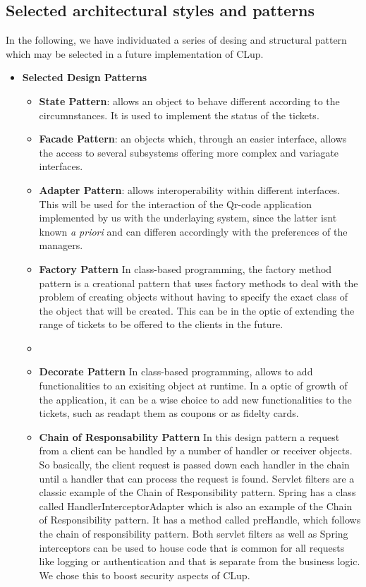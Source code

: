 \subsection{Selected architectural styles and patterns}
\label{subsect:selectedarchitecturalstylesandpatterns}

In the following, we have individuated a series of desing and structural pattern which may be selected in a future implementation of CLup.


\begin{itemize}
    \item \textbf{Selected Design Patterns}
          \begin{itemize}
            
            \item \textbf{State Pattern}: allows an object to behave different according to the circumnstances. It is used to implement the status of the tickets.
            \item \textbf{Facade Pattern}: an objects which, through an easier interface, allows the access to several subsystems offering more complex and variagate interfaces.
            \item \textbf{Adapter Pattern}: allows interoperability within different interfaces. This will be used for the interaction of the Qr-code application implemented by us with the underlaying system, since the latter isnt known \textit{a priori} and can differen accordingly with the preferences of the managers.
            \item \textbf{Factory Pattern} In class-based programming, the factory method pattern is a creational pattern that uses factory methods to deal with the problem of creating objects without having to specify the exact class of the object that will be created. This can be in the optic of extending the range of tickets to be offered to the clients in the future.
            \item \item \textbf{Decorate Pattern} In class-based programming, allows to add functionalities to an exisiting object at runtime.
            In a optic of growth of the application, it can be a wise choice to add new functionalities to the tickets, such as readapt them as coupons or as fidelty cards.
            \item \textbf{Chain of Responsability Pattern}  In this design pattern a request from a client can be handled by a number of handler or receiver objects. So basically, the client request is passed down each handler in the chain until a handler that can process the request is found. Servlet filters are a classic example of the Chain of Responsibility pattern. Spring has a class called HandlerInterceptorAdapter which is also an example of the Chain of Responsibility pattern. It has a method called preHandle, which follows the chain of responsibility pattern. Both servlet filters as well as Spring interceptors can be used to house code that is common for all requests like logging or authentication and that is separate from the business logic. We chose this to boost security aspects of CLup.

\end{itemize}
\end{itemize}
